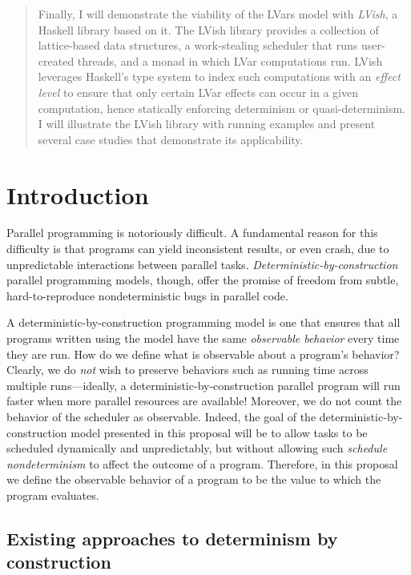\documentclass{article}
\begin{document}
\begin{abstract}
  Finally, I will demonstrate the viability of the LVars model with
  \emph{LVish}, a Haskell library based on it.  The LVish library
  provides a collection of lattice-based data structures, a
  work-stealing scheduler that runs user-created threads, and a monad
  in which LVar computations run.  LVish leverages Haskell's type
  system to index such computations with an \emph{effect level} to
  ensure that only certain LVar effects can occur in a given
  computation, hence statically enforcing determinism or
  quasi-determinism.  I will illustrate the LVish library with running
  examples and present several case studies that demonstrate its
  applicability.
\end{abstract}

\section{Introduction}\label{s:intro}

Parallel programming is notoriously difficult.  
A fundamental reason for this difficulty is that programs can yield
inconsistent results, or even crash, due to unpredictable interactions
between parallel tasks.  \emph{Deterministic-by-construction} parallel
programming models, though, offer the promise of freedom from subtle,
hard-to-reproduce nondeterministic bugs in parallel code.

A deterministic-by-construction programming model is one that ensures
that all programs written using the model have the same
\emph{observable behavior} every time they are run.  How do we define
what is observable about a program's behavior?  Clearly, we do
\emph{not} wish to preserve behaviors such as running time across
multiple runs---ideally, a deterministic-by-construction parallel
program will run faster when more parallel resources are available!
Moreover, we do not count the behavior of the scheduler as observable.
Indeed, the goal of the deterministic-by-construction model presented
in this proposal will be to allow tasks to be scheduled dynamically
and unpredictably, but without allowing such \emph{schedule
  nondeterminism} to affect the outcome of a program.  Therefore, in
this proposal we define the observable behavior of a program to be the
value to which the program evaluates.

\subsection{Existing approaches to determinism by construction}
\end{document}
